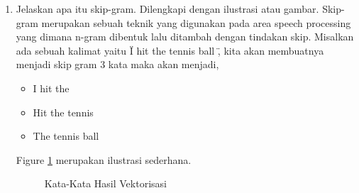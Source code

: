 \begin{enumerate}
\item Jelaskan apa itu skip-gram. Dilengkapi dengan ilustrasi atau gambar.
	\subitem Skip-gram merupakan sebuah teknik yang digunakan pada area speech processing yang dimana n-gram dibentuk lalu ditambah dengan tindakan skip. Misalkan ada sebuah kalimat yaitu \" I hit the tennis ball \", kita akan membuatnya menjadi skip gram 3 kata maka akan menjadi,
		\begin{itemize}
			\item I hit the
			\item Hit the tennis
			\item The tennis ball
		\end{itemize}
Figure \ref{YNC5-4} merupakan ilustrasi sederhana.
		\begin{figure}[!htbp]
		\caption{Kata-Kata Hasil Vektorisasi}
		\label{YNC5-4}
	\end{figure}

\end{enumerate}

